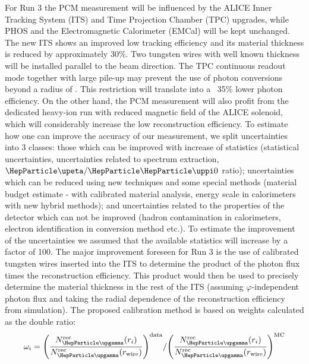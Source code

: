 For Run 3 the PCM measurement will be influenced by the ALICE Inner Tracking System (ITS) and Time Projection Chamber (TPC) upgrades, while PHOS and the Electromagnetic Calorimeter (EMCal) will be kept unchanged. 
The new ITS shows an improved low \pT{} tracking efficiency and its material thickness is reduced by approximately 30\%. Two \unit[1]{\Umm} tungsten wires with well known thickness will be installed parallel to the beam direction. 
The TPC continuous readout mode together with large pile-up may prevent the use of photon conversions beyond a radius of \unit[35]{\Ucm}. This restriction will translate into a ~35\% lower photon efficiency. On the other hand, the PCM measurement will also profit from the dedicated heavy-ion run with reduced magnetic field of the ALICE solenoid, which will considerably increase the low \pT{} reconstruction efficiency.
To estimate how one can improve the accuracy of our measurement, we split uncertainties into 3 classes: those which can be improved with increase of statistics (statistical uncertainties, uncertainties related to \PGpz spectrum extraction, $\PGh/\PGpz$ ratio); uncertainties which can be reduced using new techniques and some special methods (material budget estimate - with calibrated material analysis, energy scale in calorimeters with new hybrid \PGpz methods); and uncertainties related to the properties of the detector which can not be improved (hadron contamination in calorimeters, electron identification in conversion method etc.). To estimate the improvement of the uncertainties we assumed that the available statistics will increase by a factor of 100. 
The major improvement foreseen for Run 3 is the use of calibrated tungsten wires
inserted into the ITS to determine the product of the photon flux times the \PGg reconstruction efficiency. This product would then be used to precisely determine the material thickness in the rest of the ITS (assuming $\varphi$-independent photon flux and taking the radial dependence of the reconstruction efficiency from simulation).
The proposed calibration method is based on weights calculated 
as the double ratio: 
\begin{equation}
\omega_i= 
{\left(\frac{N_{\PGg}^{\rm rec}(r_i)}{N_{\PGg}^{\rm rec}(r_{\rm wire})}\right)^{\rm data}} /
{\left(\frac{N_{\PGg}^{\rm rec}(r_i)}{N_{\PGg}^{\rm rec}(r_{\rm wire})}\right)^{\rm MC}} 
\end{equation}
